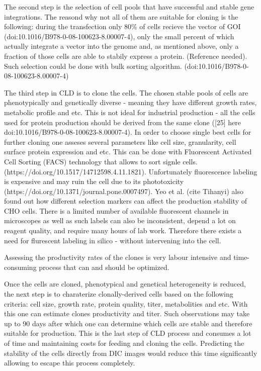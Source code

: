 The second step is the selection of cell pools that have successful and stable gene integrations. The reasond why not all of them are suitable for cloning is the following: during the transfection only 80\% of cells recieve the vector of GOI (doi:10.1016/B978-0-08-100623-8.00007-4), only the small percent of which actually integrate a vector into the genome and, as mentioned above, only a fraction of those cells are able to stabily express a protein. (Reference needed). Such selection could be done with bulk sorting algorithm. (doi:10.1016/B978-0-08-100623-8.00007-4)

The third step in CLD is to clone the cells. The chosen stable pools of cells are phenotypically and genetically diverse - meaning they have different growth rates, metabolic profile and etc. This is not ideal for industrial production - all the cells used for protein production should be derived from the same clone ([25] here doi:10.1016/B978-0-08-100623-8.00007-4). In order to choose single best cells for further cloning one asseses several parameters like cell size, granularity, cell surface protein expression and etc. This can be done with Fluorescent Activated Cell Sorting (FACS) technology that allows to sort signle cells. (https://doi.org/10.1517/14712598.4.11.1821). Unfortunately fluorescence labeling is expensive and may ruin the cell due to its phototoxicity (https://doi.org/10.1371/journal.pone.0007497). Yeo et al. (cite Tihanyi) also found out how different selection markers can affect the production stability of CHO cells. There is a limited number of available fluorescent channels in microscopes as well as such labels can also be inconsistent, depend a lot on reagent quality, and require many hours of lab work. Therefore there exists a need for flurescent labeling in silico - without intervening into the cell. 

Assessing the productivity rates of the clones is very labour intensive and time-consuming process that can and should be optimized.

Once the cells are cloned, phenotypical and genetical heterogeneity is reduced, the next step is to charaterize clonally-derived cells based on the following criteria: cell size, growth rate, protein quality, titer, metabolities and etc. With this one can estimate clones productivity and titer. Such observations may take up to 90 days after which one can determine which cells are stable and therefore suitable for production. This is the last step of CLD process and consumes a lot of time and maintaining costs for feeding and cloning the cells. Predicting the stability of the cells directly from DIC images would reduce this time significantly allowing to escape this process completely.

